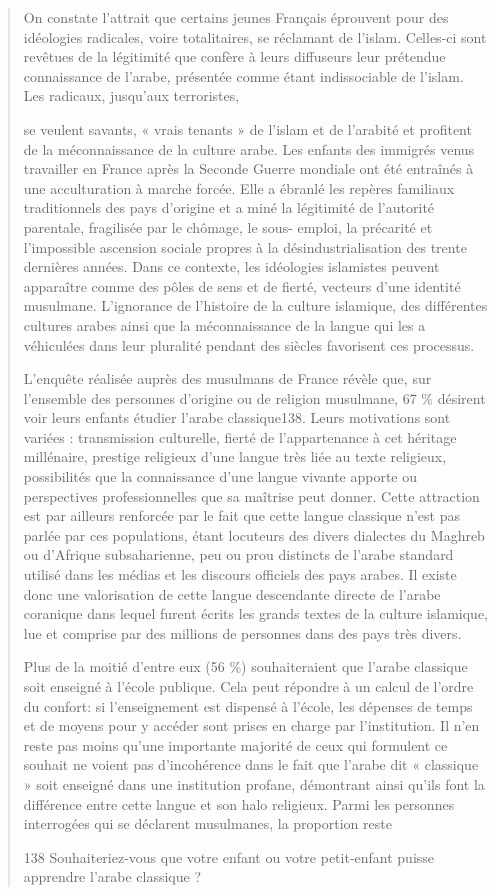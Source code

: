 \begin{quote}
On constate l'attrait que certains jeunes Français éprouvent pour des
idéologies radicales, voire totalitaires, se réclamant de l'islam.
Celles-ci sont revêtues de la légitimité que confère à leurs diffuseurs
leur prétendue connaissance de l'arabe, présentée comme étant
indissociable de l'islam. Les radicaux, jusqu'aux terroristes,



se veulent savants, « vrais tenants » de l'islam et de l'arabité et
profitent de la méconnaissance de la culture arabe. Les enfants des
immigrés venus travailler en France après la Seconde Guerre mondiale ont
été entraînés à une acculturation à marche forcée. Elle a ébranlé les
repères familiaux traditionnels des pays d'origine et a miné la
légitimité de l'autorité parentale, fragilisée par le chômage, le sous-
emploi, la précarité et l'impossible ascension sociale propres à la
désindustrialisation des trente dernières années. Dans ce contexte, les
idéologies islamistes peuvent apparaître comme des pôles de sens et de
fierté, vecteurs d'une identité musulmane. L'ignorance de l'histoire de
la culture islamique, des différentes cultures arabes ainsi que la
méconnaissance de la langue qui les a véhiculées dans leur pluralité
pendant des siècles favorisent ces processus.

L'enquête réalisée auprès des musulmans de France révèle que, sur
l'ensemble des personnes d'origine ou de religion musulmane, 67 \%
désirent voir leurs enfants étudier l'arabe classique138. Leurs
motivations sont variées : transmission culturelle, fierté de
l'appartenance à cet héritage millénaire, prestige religieux d'une
langue très liée au texte religieux, possibilités que la connaissance
d'une langue vivante apporte ou perspectives professionnelles que sa
maîtrise peut donner. Cette attraction est par ailleurs renforcée par le
fait que cette langue classique n'est pas parlée par ces populations,
étant locuteurs des divers dialectes du Maghreb ou d'Afrique
subsaharienne, peu ou prou distincts de l'arabe standard utilisé dans
les médias et les discours officiels des pays arabes. Il existe donc une
valorisation de cette langue descendante directe de l'arabe coranique
dans lequel furent écrits les grands textes de la culture islamique, lue
et comprise par des millions de personnes dans des pays très divers.

Plus de la moitié d'entre eux (56 \%) souhaiteraient que l'arabe
classique soit enseigné à l'école publique. Cela peut répondre à un
calcul de l'ordre du confort: si l'enseignement est dispensé à l'école,
les dépenses de temps et de moyens pour y accéder sont prises en charge
par l'institution. Il n'en reste pas moins qu'une importante majorité de
ceux qui formulent ce souhait ne voient pas d'incohérence dans le fait
que l'arabe dit « classique » soit enseigné dans une institution
profane, démontrant ainsi qu'ils font la différence entre cette langue
et son halo religieux. Parmi les personnes interrogées qui se déclarent
musulmanes, la proportion reste

138 Souhaiteriez-vous que votre enfant ou votre petit-enfant puisse
apprendre l'arabe classique ?
\end{quote}

